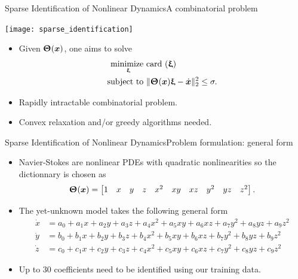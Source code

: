 \begin{frame}[t, c]{Sparse Identification of Nonlinear Dynamics}{A combinatorial problem}
  \begin{minipage}{.48\textwidth}
    \centering
    \texttt{[image: sparse\_identification]}
  \end{minipage}%
  \hfill
  \begin{minipage}{.48\textwidth}
    \begin{itemize}
    \item Given \(	\boldsymbol{\Uptheta}(\bm{x})	\), one aims to solve
      \[
        \begin{aligned}
          \operatorname*{minimize~}_{\boldsymbol{\upxi}} & \text{card }(\boldsymbol{\upxi}) \\
          \operatorname*{subject~to~} & \| \boldsymbol{\Uptheta}(\bm{x}) \boldsymbol{\upxi} - \dot{\bm{x}} \|_2^2 \leq \sigma.
        \end{aligned}
      \]
      
    \item Rapidly intractable combinatorial problem.
      
      \medskip
      
    \item Convex relaxation and/or greedy algorithms needed.
    \end{itemize}
  \end{minipage}
  
  \vspace{1cm}
\end{frame}

\begin{frame}[t, c]{Sparse Identification of Nonlinear Dynamics}{Problem formulation: general form}
  \begin{itemize}
  \item Navier-Stokes are nonlinear PDEs with quadratic nonlinearities so the dictionnary is chosen as
    \[
      \boldsymbol{\Uptheta}(\bm{x}) = \begin{bmatrix} 1 & x & y & z & x^2 & xy & xz & y^2 & yz & z^2 \end{bmatrix}.
    \]
    
    \medskip
    
  \item The yet-unknown model takes the following general form
    \[
      \begin{aligned}
        \dot{x} & = a_0 + a_1 x + a_2 y + a_3 z + a_4 x^2 + a_5 xy + a_6 xz + a_7 y^2 + a_8 yz + a_9 z^2 \\
        \dot{y} & = b_0 + b_1 x + b_2 y + b_3 z + b_4 x^2 + b_5 xy + b_6 xz + b_7 y^2 + b_8 yz + b_9 z^2 \\
        \dot{z} & = c_0 + c_1 x + c_2 y + c_3 z + c_4 x^2 + c_5 xy + c_6 xz + c_7 y^2 + c_8 yz + c_9 z^2
      \end{aligned}
    \]
    
    \medskip
    
  \item Up to 30 coefficients need to be identified using our training data.
  \end{itemize}
  
  \vspace{1cm}
\end{frame}

